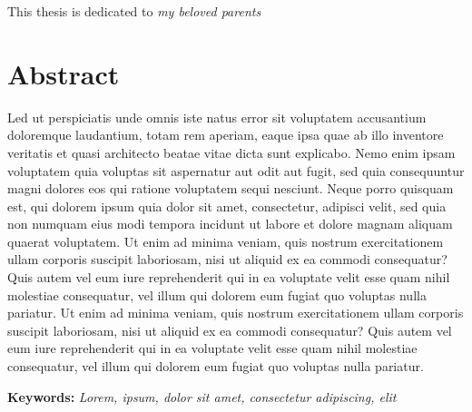 \documentclass[11pt,a4paper]{report}
\numberwithin{equation}{section}
\begin{document}
    \newpage
    \vspace*{8cm}
    \begin{center}
        \Large This thesis is dedicated to \emph{my beloved parents}
    \end{center}

    \newpage
    \chapter*{Abstract}
    Led ut perspiciatis unde omnis iste natus error sit voluptatem accusantium doloremque laudantium, totam rem aperiam, eaque ipsa quae ab illo inventore veritatis et quasi architecto beatae vitae dicta sunt explicabo. Nemo enim ipsam voluptatem quia voluptas sit aspernatur aut odit aut fugit, sed quia consequuntur magni dolores eos qui ratione voluptatem sequi nesciunt. Neque porro quisquam est, qui dolorem ipsum quia dolor sit amet, consectetur, adipisci velit, sed quia non numquam eius modi tempora incidunt ut labore et dolore magnam aliquam quaerat voluptatem. Ut enim ad minima veniam, quis nostrum exercitationem ullam corporis suscipit laboriosam, nisi ut aliquid ex ea commodi consequatur? Quis autem vel eum iure reprehenderit qui in ea voluptate velit esse quam nihil molestiae consequatur, vel illum qui dolorem eum fugiat quo voluptas nulla pariatur. Ut enim ad minima veniam, quis nostrum exercitationem ullam corporis suscipit laboriosam, nisi ut aliquid ex ea commodi consequatur? Quis autem vel eum iure reprehenderit qui in ea voluptate velit esse quam nihil molestiae consequatur, vel illum qui dolorem eum fugiat quo voluptas nulla pariatur.

    \textbf{Keywords:} \textit{Lorem, ipsum, dolor sit amet, consectetur adipiscing, elit}

    \newpage
\end{document}
